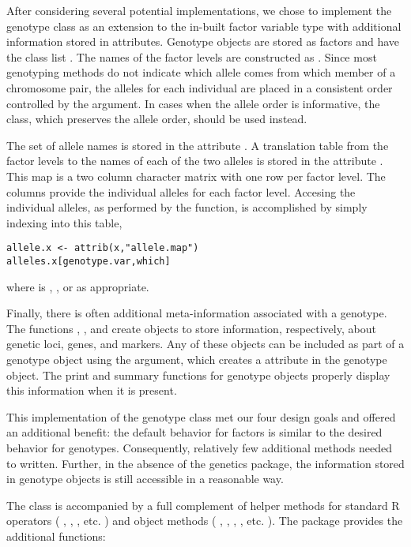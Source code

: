 \documentclass{report}
\begin{document}
After considering several potential implementations, we chose to
implement the genotype class as an extension to the in-built factor
variable type with additional information stored in attributes.
Genotype objects are stored as factors and have the class list
.  The names of the factor levels are
constructed as .  Since most
genotyping methods do not indicate which allele comes from which
member of a chromosome pair, the alleles for each individual are
placed in a consistent order controlled by the 
argument.  In cases when the allele order is informative, the
 class, which preserves the allele order, should be
used instead.

The set of allele names is stored in the attribute
.  A translation table from the factor levels to
the names of each of the two alleles is stored in the attribute
.  This map is a two column character matrix with one
row per factor level.  The columns provide the individual alleles for
each factor level.  Accesing the individual alleles, as performed by the  function, is accomplished by simply indexing into this table,
\begin{verbatim}
allele.x <- attrib(x,"allele.map") 
alleles.x[genotype.var,which]
\end{verbatim}
where  is , , or  as
appropriate.

Finally, there is often additional meta-information associated with a
genotype.  The functions , , and 
create objects to store information, respectively, about genetic loci,
genes, and markers.  Any of these objects can be included as part of a
genotype object using the  argument, which creates a
 attribute in the genotype object.  The print and summary
functions for genotype objects properly display this information when
it is present.

This implementation of the genotype class met our four design goals
and offered an additional benefit: the default behavior for factors is
similar to the desired behavior for genotypes.  Consequently,
relatively few additional methods needed to written.  Further, in the
absence of the genetics package, the information stored in genotype
objects is still accessible in a reasonable way.

The  class is accompanied by a full complement of
helper methods for standard R operators ( \code{[]}, \code{[<-},
\code{==}, etc. ) and object methods ( , ,
, , etc. ).  The 
package provides the additional functions:
\end{document}
